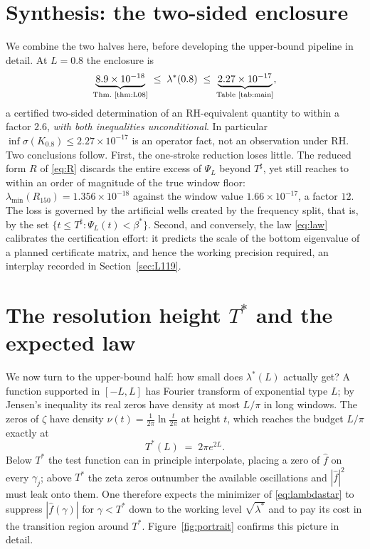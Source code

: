 ﻿\documentclass[11pt]{article}
\newcommand{\lmin}{\lambda^{*}}
\newcommand{\lammin}{\lambda_{\min}}
\newcommand{\Tstar}{T^{*}}
\newcommand{\Tsharp}{T^{\sharp}}
\newcommand{\fhat}{\hat f}
\begin{document}
\section{Synthesis: the two-sided enclosure}\label{sec:synthesis}

We combine the two halves here, before developing the upper-bound
pipeline in detail.  At $L=0.8$ the enclosure is
\[
  \underbrace{8.9\times10^{-18}}_{\text{Thm.~\ref{thm:L08}}}
  \;\le\;\lmin(0.8)\;\le\;
  \underbrace{2.27\times10^{-17}}_{\text{Table~\ref{tab:main}}} ,
\]
a certified two-sided determination of an RH-equivalent quantity to
within a factor $2.6$, \emph{with both inequalities unconditional}.
In particular $\inf\sigma(K_{0.8})\le2.27\times10^{-17}$ is an
operator fact, not an observation under RH.  Two conclusions follow.
First, the one-stroke reduction loses little.  The reduced form $R$
of \eqref{eq:R} discards the entire excess of $\Psi_L$ beyond
$\Tsharp$, yet still reaches to within an order of magnitude of the
true window floor: $\lammin(R_{150})=1.356\times10^{-18}$ against the
window value $1.66\times10^{-17}$, a factor $12$.  The loss is
governed by the artificial wells created by the frequency split,
that is, by the set $\{t\le\Tsharp:\Psi_L(t)<\beta^*\}$.  Second, and
conversely, the law \eqref{eq:law} calibrates the certification
effort: it predicts the scale of the bottom eigenvalue of a planned
certificate matrix, and hence the working precision required, an
interplay recorded in Section~\ref{sec:L119}.

\section{The resolution height \texorpdfstring{$\Tstar$}{T*} and the
  expected law}\label{sec:mechanism}

We now turn to the upper-bound half: how small does $\lmin(L)$
actually get?  A function supported in $[-L,L]$ has Fourier transform
of exponential type $L$; by Jensen's inequality its real zeros have
density at most $L/\pi$ in long windows.  The zeros of $\zeta$ have
density $\nu(t)=\frac{1}{2\pi}\ln\frac{t}{2\pi}$ at height $t$, which
reaches the budget $L/\pi$ exactly at
\[
  \Tstar(L)\;=\;2\pi e^{2L}.
\]
Below $\Tstar$ the test function can in principle interpolate, placing
a zero of $\fhat$ on every $\gamma_j$; above $\Tstar$ the zeta zeros
outnumber the available oscillations and $|\fhat|^2$ must leak onto
them.  One therefore expects the minimizer of \eqref{eq:lambdastar} to
suppress $|\fhat(\gamma)|$ for $\gamma<\Tstar$ down to the working
level $\sqrt{\lmin}$ and to pay its cost in the transition region
around $\Tstar$.  Figure~\ref{fig:portrait} confirms this picture in
detail.
\end{document}
